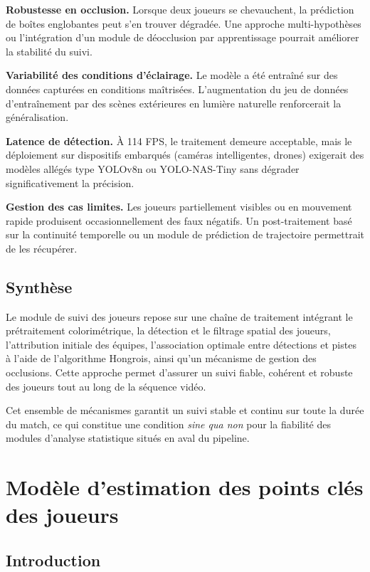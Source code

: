 \textbf{Robustesse en occlusion.} Lorsque deux joueurs se chevauchent, la prédiction de boîtes englobantes peut s'en trouver dégradée. Une approche multi-hypothèses ou l'intégration d'un module de déocclusion par apprentissage pourrait améliorer la stabilité du suivi.

\textbf{Variabilité des conditions d'éclairage.} Le modèle a été entraîné sur des données capturées en conditions maîtrisées. L'augmentation du jeu de données d'entraînement par des scènes extérieures en lumière naturelle renforcerait la généralisation.

\textbf{Latence de détection.} À 114 FPS, le traitement demeure acceptable, mais le déploiement sur dispositifs embarqués (caméras intelligentes, drones) exigerait des modèles allégés type YOLOv8n ou YOLO-NAS-Tiny sans dégrader significativement la précision.

\textbf{Gestion des cas limites.} Les joueurs partiellement visibles ou en mouvement rapide produisent occasionnellement des faux négatifs. Un post-traitement basé sur la continuité temporelle ou un module de prédiction de trajectoire permettrait de les récupérer.

\subsection{Synthèse}

Le module de suivi des joueurs repose sur une chaîne de traitement intégrant le prétraitement colorimétrique, 
la détection et le filtrage spatial des joueurs, l’attribution initiale des équipes, l’association optimale entre 
détections et pistes à l’aide de l’algorithme Hongrois, ainsi qu’un mécanisme de gestion des occlusions. Cette approche 
permet d’assurer un suivi fiable, cohérent et robuste des joueurs tout au long de la séquence vidéo.

Cet ensemble de mécanismes garantit un suivi stable et continu sur toute la durée du match, ce qui constitue une condition \textit{sine qua non} pour la fiabilité des modules d'analyse statistique situés en aval du pipeline.


\section{Modèle d'estimation des points clés des joueurs}

\subsection{Introduction}

